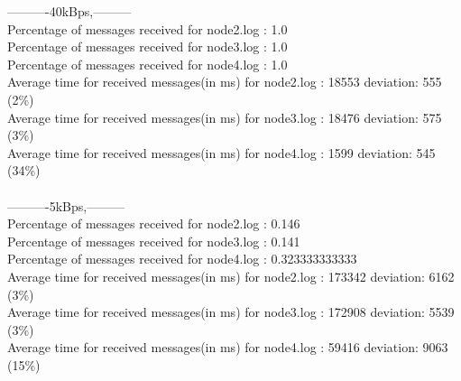         ----------40kBps,---------\\
        Percentage of messages received for node2.log : 1.0\\
        Percentage of messages received for node3.log : 1.0\\
        Percentage of messages received for node4.log : 1.0\\
        Average time for received messages(in ms) for  node2.log : 18553 	deviation: 555 (2\%)\\
        Average time for received messages(in ms) for  node3.log : 18476 	deviation: 575 (3\%)\\
        Average time for received messages(in ms) for  node4.log : 1599 	deviation: 545 (34\%)\\\\
        ----------5kBps,---------\\
        Percentage of messages received for node2.log : 0.146\\
        Percentage of messages received for node3.log : 0.141\\
        Percentage of messages received for node4.log : 0.323333333333\\
        Average time for received messages(in ms) for  node2.log : 173342 	deviation: 6162 (3\%)\\
        Average time for received messages(in ms) for  node3.log : 172908 	deviation: 5539 (3\%)\\
        Average time for received messages(in ms) for  node4.log : 59416 	deviation: 9063 (15\%)\\\\
